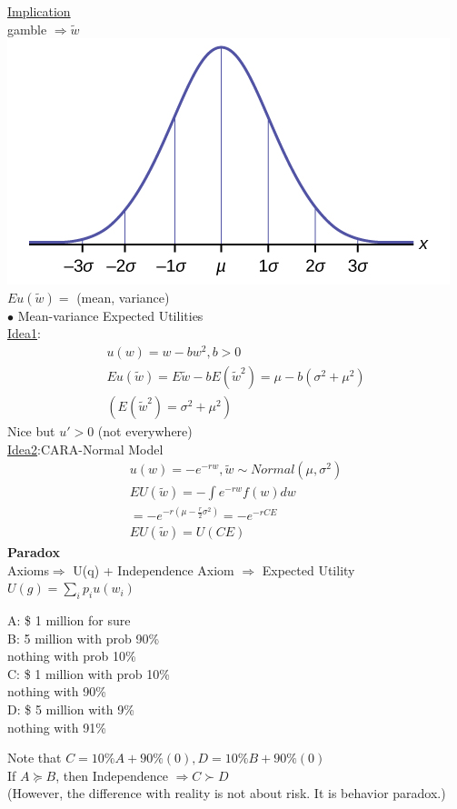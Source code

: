 \documentclass[letterpaper,13pt,single,pdftex]{scrartcl}
\begin{document}
\underline{Implication}\\
gamble $\Rightarrow \tilde{w}$\\
\includegraphics{normal.jpg}\\
$E u (\tilde{w}) =$ (mean, variance)\\
$\bullet$ Mean-variance Expected Utilities\\
\underline{Idea1}: 
\begin{gather*}
    u(w) = w-bw^2, b>0\\
    E u(\tilde{w}) = E \tilde{w} - b E(\tilde{w}^2) = \mu - b(\sigma^2 +\mu^2) \\
    ( E(\tilde{w}^2) = \sigma^2 +\mu^2)
\end{gather*}
Nice but $u'>0 $ (not everywhere)\\
\underline{Idea2}:CARA-Normal Model
\begin{gather*}
    u(w) = -e^{-rw},\tilde{w}\sim Normal(\mu, \sigma^2)\\
    E U(\tilde{w}) = -\int e^{-rw}f(w)dw\\
                  = -e^{-r(\mu - \frac{r}{2}\sigma^2)} = -e^{-rCE}\\
    E U(\tilde{w}) = U(CE)
\end{gather*}
\textbf{Paradox}\\
Axioms$\Rightarrow$ U(q) + Independence Axiom
 $\Rightarrow$ Expected Utility\quad 
            $U(g) = \sum\limits_{i}p_iu(w_i)$\\
\begin{center}
A: \$ 1 million for sure \\
B: 5 million with prob 90\%\\
    nothing with prob 10\%\\
C: \$ 1 million with prob 10\%\\
    nothing with 90\%\\
D: \$ 5 million with 9\%\\
    nothing with 91\%\\
\end{center}
Note that $C = 10\% A +90\% (0), D = 10\%B + 90\%(0)$\\
If $A\succeq B$, then Independence $\Rightarrow C\succ D$\\
(However, the difference with reality is not about risk. It is behavior paradox.) \\
\end{document}
